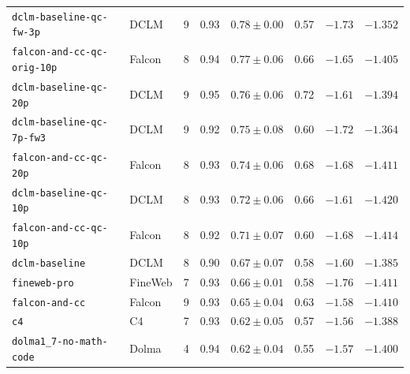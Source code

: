 \documentclass[11pt]{article}
\begin{document}
\begin{table}[h]
\begin{tabular}{@{}llcc ccc c@{}}
\texttt{dclm-baseline-qc-fw-3p} & DCLM & 9 & 0.93 & $0.78\pm0.00$ & 0.57 & $-1.73$ & $-1.352$ \\
\texttt{falcon-and-cc-qc-orig-10p} & Falcon & 8 & 0.94 & $0.77\pm0.06$ & 0.66 & $-1.65$ & $-1.405$ \\
\texttt{dclm-baseline-qc-20p} & DCLM & 9 & 0.95 & $0.76\pm0.06$ & 0.72 & $-1.61$ & $-1.394$ \\
\texttt{dclm-baseline-qc-7p-fw3} & DCLM & 9 & 0.92 & $0.75\pm0.08$ & 0.60 & $-1.72$ & $-1.364$ \\
\texttt{falcon-and-cc-qc-20p} & Falcon & 8 & 0.93 & $0.74\pm0.06$ & 0.68 & $-1.68$ & $-1.411$ \\
\texttt{dclm-baseline-qc-10p} & DCLM & 8 & 0.93 & $0.72\pm0.06$ & 0.66 & $-1.61$ & $-1.420$ \\
\texttt{falcon-and-cc-qc-10p} & Falcon & 8 & 0.92 & $0.71\pm0.07$ & 0.60 & $-1.68$ & $-1.414$ \\
\texttt{dclm-baseline} & DCLM & 8 & 0.90 & $0.67\pm0.07$ & 0.58 & $-1.60$ & $-1.385$ \\
\texttt{fineweb-pro} & FineWeb & 7 & 0.93 & $0.66\pm0.01$ & 0.58 & $-1.76$ & $-1.411$ \\
\texttt{falcon-and-cc} & Falcon & 9 & 0.93 & $0.65\pm0.04$ & 0.63 & $-1.58$ & $-1.410$ \\
\texttt{c4} & C4 & 7 & 0.93 & $0.62\pm0.05$ & 0.57 & $-1.56$ & $-1.388$ \\
\texttt{dolma1\_7-no-math-code} & Dolma & 4 & 0.94 & $0.62\pm0.04$ & 0.55 & $-1.57$ & $-1.400$ \\
\bottomrule
\end{tabular}
\end{table}
\end{document}
